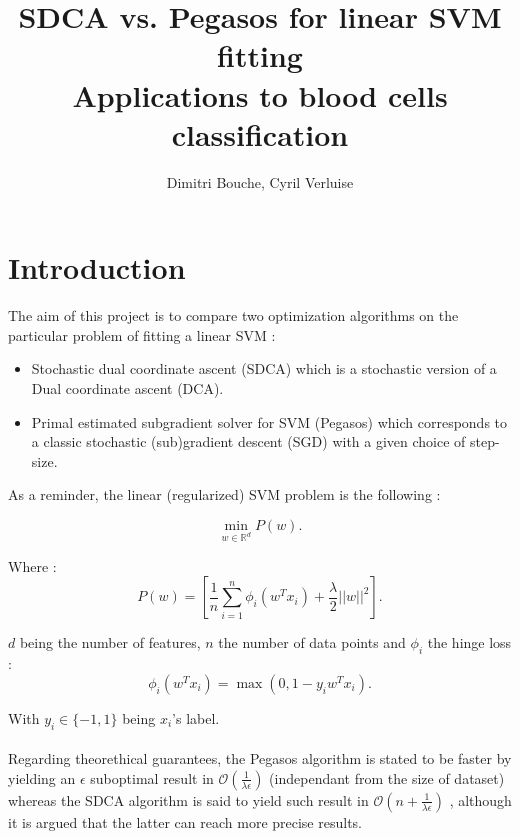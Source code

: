\documentclass[10pt,a4paper]{article}
\begin{document}
\title{%
  SDCA \cite{2} vs. Pegasos \cite{1} for linear SVM fitting \\
  \large Applications to blood cells classification}

\author{Dimitri Bouche, Cyril Verluise}

\maketitle

\section{Introduction}

The aim of this project is to compare two optimization algorithms on the particular problem of fitting a linear SVM :

\begin{itemize}
	\item Stochastic dual coordinate ascent (SDCA) \cite{2} which is a stochastic version of a Dual coordinate ascent (DCA).
	\item Primal estimated subgradient solver for SVM (Pegasos) \cite{1} which corresponds to a classic stochastic (sub)gradient descent (SGD) with a given choice of step-size.
\end{itemize}

As a reminder, the linear (regularized) SVM problem is the following :

\begin{equation}\label{P}
\min_{w \in \mathbb{R}^d} P(w).
\end{equation}

Where : $$P(w) = \left [ \frac{1}{n} \sum_{i=1}^n \phi_i (w^T x_i) + \frac{\lambda}{2} || w ||^2 \right ].$$


$d$ being the number of features, $n$ the number of data points and $\phi_i$ the hinge loss : 
$$\phi_i(w^T x_i) = \max(0, 1 - y_iw^Tx_i).$$

With $y_i \in \{-1, 1\}$ being $x_i$'s label.

\paragraph{}

Regarding theorethical guarantees, the Pegasos algorithm is stated to be faster by \cite{1} yielding an $\epsilon$ suboptimal result in $\mathcal{O}(\frac{1}{\lambda \epsilon})$ (independant from the size of dataset) whereas the SDCA algorithm is said to yield such result in $\mathcal{O}(n + \frac{1}{\lambda \epsilon})$ \cite{2}, although it is argued that the latter can reach more precise results.
\end{document}
